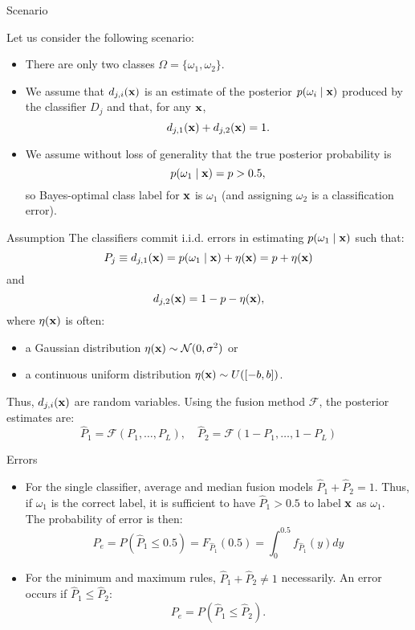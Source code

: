 \documentclass[xcolor=table]{beamer}
\begin{document}
\begin{frame}{Scenario}

Let us consider the following scenario:

\begin{itemize}
    \item There are only two classes \(\Omega = \{\omega_1, \omega_2\}\).
    \item We assume that \(d_{j,i}({\mathbf x})\) is an estimate of the posterior \(p(\omega_i\mid {\mathbf x})\) produced by the classifier \(D_j\) and that, for any \({\mathbf x}\),
    \[
    d_{j,1}({\mathbf x}) + d_{j,2}({\mathbf x}) = 1.
    \]
    \item We assume without loss of generality that the true posterior probability is
    \[
    p(\omega_1 \mid {\mathbf x}) = p > 0.5,
    \]
    so Bayes-optimal class label for \({\mathbf x}\) is \(\omega_1\) (and assigning \(\omega_2\) is a classification error).
\end{itemize}
\end{frame}


\begin{frame}{Assumption}
    The classifiers commit i.i.d. errors in estimating \(p(\omega_1 \mid {\mathbf x})\) such that:
    \[
    P_j \equiv d_{j,1}({\mathbf x}) = p(\omega_1\mid {\mathbf x}) + \eta({\mathbf x}) = p + \eta({\mathbf x})
    \]
    and
    \[
    d_{j,2}({\mathbf x}) = 1 - p - \eta({\mathbf x}),
    \]
    where \(\eta({\mathbf x})\) is often:
    \begin{itemize}
        \item a Gaussian distribution \(\eta({\mathbf x}) \sim \mathcal N (0,\sigma^2)\) or
        \item a continuous uniform distribution \(\eta({\mathbf x}) \sim U([-b,b])\).
    \end{itemize}

\pause
    Thus, \(d_{j,i}({\mathbf x})\) are random variables. Using the fusion method \(\mathcal F\), the posterior estimates are:
    \[
    \hat P_1 = \mathcal F \left(P_1,\dots, P_L\right), \quad \hat P_2 = \mathcal F \left(1-P_1,\dots, 1-P_L\right)
    \]
\end{frame}


\begin{frame}{Errors}
    \begin{itemize}
        \item For the single classifier, average and median fusion models \(\hat P_1 + \hat P_2 = 1\). Thus, if \(\omega_1\) is the correct label, it is sufficient to have \(\hat P_1 > 0.5\) to label \({\mathbf x}\) as \(\omega_1\).\\
        The probability of error is then:
        \[
        P_e = P(\hat P_1 \leq 0.5) = F_{\hat P_1}(0.5) = \int_0^{0.5}f_{\hat P_1}(y) dy
        \]
        \pause
        \item For the minimum and maximum rules, \(\hat P_1 + \hat P_2 \neq 1\) necessarily. An error occurs if \(\hat P_1 \leq \hat P_2\):
        \[
        P_e = P(\hat P_1 \leq \hat P_2).
        \]
    \end{itemize}
\end{frame}
\end{document}
